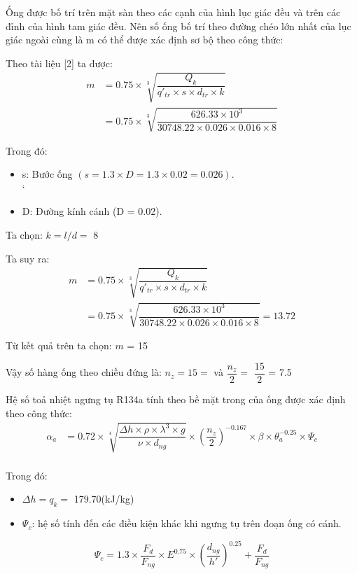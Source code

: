 Ống được bố trí trên mặt sàn theo các cạnh của hình lục giác đều và trên các đỉnh của hình tam giác đều. Nên số ống bố trí theo đường chéo lớn nhất của lục giác ngoài cùng là m có thể được xác định sơ bộ theo công thức:

Theo tài liệu [2] ta được:
\begin{equation*}
	\begin{split}
		m &= 0.75\times\sqrt[3]{\dfrac{Q_{k}}{q'_{tr}\times s\times d_{tr}\times k}} \\
		&= 0.75 \times \sqrt[3]{\dfrac{626.33 \times 10^3}{30748.22 \times 0.026 \times 0.016 \times 8}}
	\end{split}
\end{equation*}

Trong đó:
\begin{itemize}
	\item s: Bước ống $(s = 1.3\times D = 1.3 \times 0.02 = 0.026)$.\\
`	\item D: Đường kính cánh (D = 0.02).
\end{itemize}

Ta chọn: $k = l/d = $ 8

Ta suy ra:
\begin{equation*}
	\begin{split}
		m &= 0.75\times\sqrt[3]{\dfrac{Q_{k}}{q'_{tr}\times s\times d_{tr}\times k}} \\
		&=0.75 \times \sqrt[3]{\dfrac{626.33 \times 10^3}{30748.22 \times 0.026 \times 0.016 \times 8}} = 13.72
	\end{split}
\end{equation*}

Từ kết quả trên ta chọn: $m$ = 15

Vậy số hàng ống theo chiều đứng là: $n_{z} = 15 = $ và $\dfrac{n_{z}}{2} =$ $\dfrac{15}{2}$ = 7.5

Hệ số toả nhiệt ngưng tụ R134a tính theo bề mặt trong của ống được xác định theo công thức:
\begin{equation*}
	\begin{split}
		\alpha_{a} &= 0.72\times\sqrt[4]{\dfrac{\Delta h\times \rho\times\lambda^3\times g}{\nu\times d_{ng}}}\times\left(\dfrac{n_{z}}{2}\right)^{-0.167}\times\beta\times\theta^{-0.25}_{a}\times\Psi_{c} \\
	\end{split}
\end{equation*}

Trong đó:
\begin{itemize}
	\item $\Delta h = q_{k} = $ 179.70(kJ/kg)
	\item $\Psi_{c}$: hệ số tính đến các điều kiện khác khi ngưng tụ trên đoạn ống có cánh.
\end{itemize}
\begin{equation*}
	\Psi_{c} = 1.3\times\dfrac{F_{d}}{F_{ng}}\times E^{0.75}\times\left(\dfrac{d_{ng}}{h'}\right)^{0.25} + \dfrac{F_{d}}{F_{ng}}
\end{equation*}

